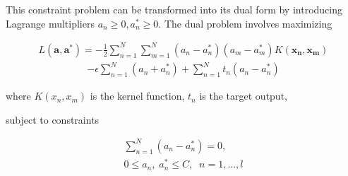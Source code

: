 \documentclass[11pt,twoside,notitlepage]{report}
\begin{document}
This constraint problem can be transformed into its dual form  by introducing
Lagrange multipliers \(a_n \geq 0, a_n^* \geq 0\).  The dual problem involves
maximizing

\begin{gather} \label{eq:maxim}  L(\mathbf{a},\mathbf{a^*}) =
  -\frac{1}{2}\sum_{n=1}^{N}\sum_{m=1}^{N}(a_n-a_n^*)(a_m-a_m^*)K(\mathbf{x_n},\mathbf{x_m})
\end{gather} \begin{gather*} -\epsilon\sum_{n=1}^{N}(a_n+a_n^*) +
  \sum_{n=1}^{N}t_n(a_n-a_n^*) \end{gather*}

where \(K(x_n,x_m) \) is the kernel function, \(t_n\) is the target output,

subject to constraints

\begin{gather}
  \sum_{n=1}^{N}(a_n-a_n^*)=0,\\
  0\leq a_n,\; a_n^*\leq C,\;\;    n=1,...,l 
\end{gather}
\end{document}
